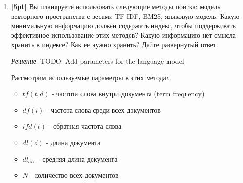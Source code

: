 \begin{enumerate}
	\textit{Решение.} 
	\begin{itemize}
		\item Запросы других людей, за последние $N$ минут, которые похожи на текущий запрос 
		(например, пересекаются по некоторым словам). Пример: $q=$\textit{Презентация ...}, 
		возможная подсказка \textit{"Презентация apple"}. Т.к. она (условно) была вчера вечером и 
		уже многие сегодня весь день хотели найти об этом информацию.
		\item Запросы других людей, которые были в это же время суток/в тот день недели/в таких 
		же числах месяца/в то же время года, которые похожи на текущий запрос (например, 
		пересекаются по некоторым словам). Пример: пятница, полдень $q=$ \textit{"погода на "}. 
		Логичнее дополнить как \textit{"на выходные"}. То же самое работает и для праздников.
		\item Запросы которые уже встречались от этого же пользователя и похож на текущий. Часто 
		бывает нужно повторить поиск, но не всегда пользователь запоминает абсолютно точно текст 
		запроса, но это может влиять на выдачу.
		\item Если известна геопозиция пользователя(либо история запросов с какими-либо 
		гео-данными), то можно дополнить запрос соответствующей информацией.
		
		Пример: $q=$\textit{Погода в}. Возможная рекомендация $"Погода в Турции"$, если он уже 
		упоминал Турцию, когда искал билеты и отель.
	\end{itemize}
	\item \textbf{[5pt]} Вы планируете использовать следующие методы поиска: модель векторного 
	пространства с весами TF-IDF, BM25, языковую модель. Какую минимальную информацию должен 
	содержать индекс, чтобы поддерживать эффективное использование этих методов? Какую информацию 
	нет смысла хранить в индексе? Как ее нужно хранить? Дайте развернутый ответ.
	
	\textit{Решение.} TODO: Add parameters for the language model 
	
	Рассмотрим используемые параметры в этих методах.
	\begin{itemize}
		\item $tf(t, d)$ - частота слова внутри документа (term frequency)
		\item $df(t)$ - частота слова среди всех документов
		\item $ifd(t)$ - обратная частота слова
		\item $dl(d)$ - длина документа
		\item $dl_{ave}$ - средняя длина документа
		\item $N$ - количество всех документов
	\end{itemize}
	

\end{enumerate}
